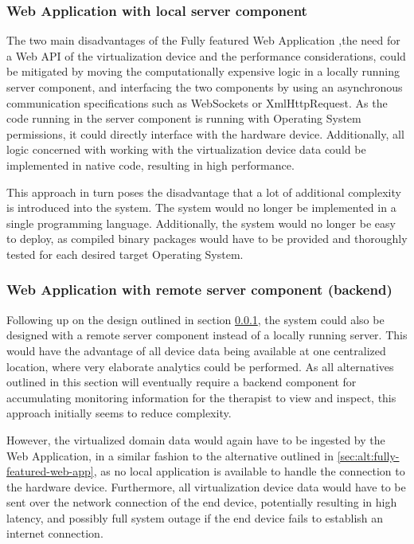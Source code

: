 \subsubsection{Web Application with local server component}
\label{sec:alt:thin-web-app}
The two main disadvantages of the Fully featured Web Application ,the need for a Web API of the virtualization device and the performance considerations, could be mitigated by moving the computationally expensive logic in a locally running server component, and interfacing the two components by using an asynchronous communication specifications such as WebSockets or XmlHttpRequest. As the code running in the server component is running with Operating System permissions, it could directly interface with the hardware device. Additionally, all logic concerned with working with the virtualization device data could be implemented in native code, resulting in high performance.

This approach in turn poses the disadvantage that a lot of additional complexity is introduced into the system. The system would no longer be implemented in a single programming language. Additionally, the system would no longer be easy to deploy, as compiled binary packages would have to be provided and thoroughly tested for each desired target Operating System.
\subsubsection{Web Application with remote server component (backend)}
\label{sec:alt:thin-remote-web-app}
Following up on the design outlined in section \ref{sec:alt:thin-web-app}, the system could also be designed with a remote server component instead of a locally running server. This would have the advantage of all device data being available
at one centralized location, where very elaborate analytics could be performed. As all alternatives outlined in this section will eventually require a backend component for accumulating monitoring information for the therapist to view and inspect, this approach initially seems to reduce complexity.

However, the virtualized domain data would again have to be ingested by the Web Application, in a similar fashion to the alternative outlined in \ref{sec:alt:fully-featured-web-app}, as no local application is available to handle the connection to the hardware device. Furthermore, all virtualization device data would have to be sent over the network connection of the end device, potentially resulting in high latency, and possibly full system outage if the end device fails to establish an internet connection.
